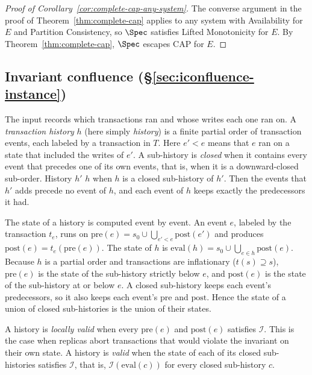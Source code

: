 \begin{proof}[Proof of Corollary~\ref{cor:complete-cap-any-system}]
The converse argument in the proof of Theorem~\ref{thm:complete-cap} applies
to any system with Availability for $E$ and Partition Consistency, so $\Spec$
satisfies Lifted Monotonicity for $E$.  By Theorem~\ref{thm:complete-cap},
$\Spec$ escapes CAP for $E$.
\end{proof}

\subsection{Invariant confluence (\S\ref{sec:iconfluence-instance})}
\label{app:iconfluence}

The input records which transactions ran and whose writes each one ran on.
A \emph{transaction history} $h$ (here simply \emph{history}) is a finite
partial order of transaction events, each labeled by a transaction in $T$.
Here $e'<e$ means that $e$ ran on a state that included the writes of $e'$.
A sub-history is \emph{closed} when it contains every event that precedes one
of its own events, that is, when it is a downward-closed sub-order.  History
$h'$ \inrel $h$ when $h$ is a closed sub-history of $h'$.  Then the events
that $h'$ adds precede no event of $h$, and each event of $h$ keeps exactly
the predecessors it had.

The state of a history is computed event by event.  An event $e$, labeled by
the transaction $t_e$, runs on
$\mathrm{pre}(e)=s_0\cup\bigcup_{e'<e}\mathrm{post}(e')$ and produces
$\mathrm{post}(e)=t_e(\mathrm{pre}(e))$.  The state of $h$ is
$\mathrm{eval}(h)=s_0\cup\bigcup_{e\in h}\mathrm{post}(e)$.  Because $h$ is a
partial order and transactions are inflationary ($t(s)\supseteq s$),
$\mathrm{pre}(e)$ is the state of the sub-history strictly below $e$, and
$\mathrm{post}(e)$ is the state of the sub-history at or below $e$.  A
closed sub-history keeps each event's predecessors, so it also keeps each
event's $\mathrm{pre}$ and $\mathrm{post}$.  Hence the state of a union of
closed sub-histories is the union of their states.

A history is \emph{locally valid} when every $\mathrm{pre}(e)$ and
$\mathrm{post}(e)$ satisfies $\mathcal I$.  This is the case when replicas
abort transactions that would violate the invariant on their own state.  A
history is \emph{valid} when the state of each of its closed sub-histories
satisfies $\mathcal I$, that is, $\mathcal I(\mathrm{eval}(c))$ for every
closed sub-history $c$.


